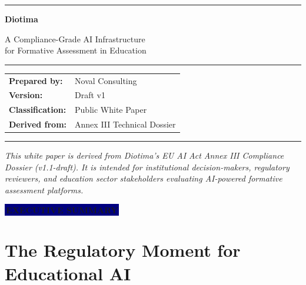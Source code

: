\documentclass[11pt, a4paper]{article}
\newcommand{\sectiontag}[1]{%
  \vspace{4pt}%
  {\color{white}\colorbox{navy}{\small\bfseries\,#1\,}}%
  \vspace{6pt}%
}
\begin{document}
\thispagestyle{empty}

\vspace*{30mm}

{\color{navy}\rule{\textwidth}{1.2pt}}
\vspace{6pt}

{\color{navy}\fontsize{32}{38}\selectfont\bfseries Diotima}

\vspace{4pt}

{\color{teal}\Large A Compliance-Grade AI Infrastructure\\[4pt]for Formative Assessment in Education}

\vspace{10pt}

{\color{navy}\rule{\textwidth}{0.4pt}}

\vspace{10pt}

\begin{tabular}{@{}ll}
  \textbf{\color{mutedgrey}Prepared by:}    & \color{darktext}Noval Consulting \\[3pt]
  \textbf{\color{mutedgrey}Version:}        & \color{darktext}Draft v1 \\[3pt]
  \textbf{\color{mutedgrey}Classification:} & \color{darktext}Public White Paper \\[3pt]
  \textbf{\color{mutedgrey}Derived from:}   & \color{darktext}Annex III Technical Dossier \\
\end{tabular}

\vfill

{\color{rulegrey}\rule{\textwidth}{0.4pt}}

{\small\color{mutedgrey}\textit{This white paper is derived from Diotima's EU AI Act Annex III Compliance Dossier (v1.1-draft). It is intended for institutional decision-makers, regulatory reviewers, and education sector stakeholders evaluating AI-powered formative assessment platforms.}}

\newpage

\sectiontag{EXECUTIVE SUMMARY}

\section*{The Regulatory Moment for Educational AI}
\end{document}
